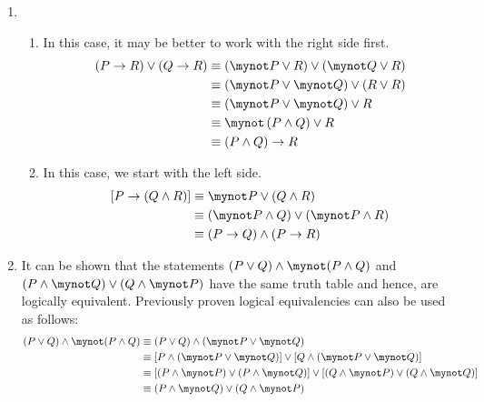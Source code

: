 \begin{enumerate}
\item \begin{enumerate}
\item In this case, it may be better to work with the right side first.
\begin{align*}
\left( {P \to R} \right) \vee \left( {Q \to R} \right) &\equiv 
\left( \mynot P \vee R \right) \vee \left( \mynot Q \vee R \right) \\
&\equiv 
\left( \mynot P \vee \mynot Q \right) \vee \left( R \vee R \right) \\
&\equiv
\left( \mynot P \vee \mynot Q \right) \vee R \\
&\equiv 
\mynot \left( P \wedge Q \right) \vee R \\
&\equiv \left( P \wedge Q \right) \to R
\end{align*}

\item In this case, we start with the left side.
\begin{align*}
\left[ P \to \left( Q \wedge R \right) \right] &\equiv \mynot P \vee \left( Q \wedge R \right) \\
              &\equiv \left( \mynot P \wedge Q \right) \vee \left( \mynot P \wedge R \right) \\
              &\equiv \left( P \to Q \right) \wedge \left( P \to R \right)
\end{align*}
\end{enumerate}

\item It can be shown that the statements $(P  \vee Q) \wedge \mynot(P \wedge Q)$ and 
$(P \wedge \mynot Q) \vee (Q \wedge \mynot P)$ have the same truth table and hence, are logically equivalent.  Previously proven logical equivalencies can also be used as follows:
\begin{align*}
(P  \vee Q) \wedge \mynot(P \wedge Q) &\equiv (P \vee Q) \wedge (\mynot P \vee \mynot Q) \\
    &\equiv [P \wedge (\mynot P \vee \mynot Q)] \vee [Q \wedge (\mynot P \vee \mynot Q)] \\
    &\equiv [(P \wedge \mynot P) \vee (P \wedge \mynot Q)] \vee [(Q \wedge \mynot P) \vee (Q \wedge \mynot Q)] \\
    &\equiv (P \wedge \mynot Q) \vee (Q \wedge \mynot P)
\end{align*}


\end{enumerate}
